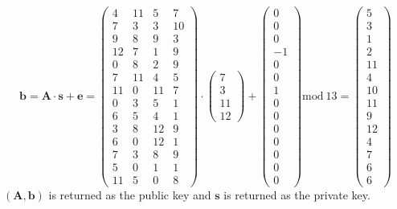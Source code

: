 \documentclass[a4paper, 11pt, openany]{book}
\begin{document}
$$
\textbf{b} = \textbf{A}\cdot \textbf{s} + \textbf{e}
 =  \begin{pmatrix}
 4& 11&  5&  7\\
 7&  3&  3& 10\\
 9&  8&  9&  3\\
 12&  7&  1&  9\\
 0&  8&  2&  9\\
 7& 11&  4&  5\\
 11&  0& 11&  7\\
 0&  3&  5&  1\\
 6&  5&  4&  1\\
 3&  8& 12&  9\\
 6&  0& 12&  1\\
 7&  3&  8&  9\\
 5&  0&  1&  1\\
 11&  5&  0&  8
 \end{pmatrix} \cdot
  \begin{pmatrix} 7 \\ 3 \\ 11 \\ 12\end{pmatrix}
  +
  \begin{pmatrix}0\\0\\0\\-1\\0\\0\\1\\0\\0\\0\\0\\0\\0\\0\end{pmatrix}
  \text{mod}~13 =\begin{pmatrix}
  	5\\3\\1\\2\\11\\4\\10\\11\\9\\12\\4\\7\\6\\6
  \end{pmatrix}
$$
$(\textbf{A},\textbf{b})$ is returned as the public key and $\textbf{s}$ is returned as the private key.
\end{document}
